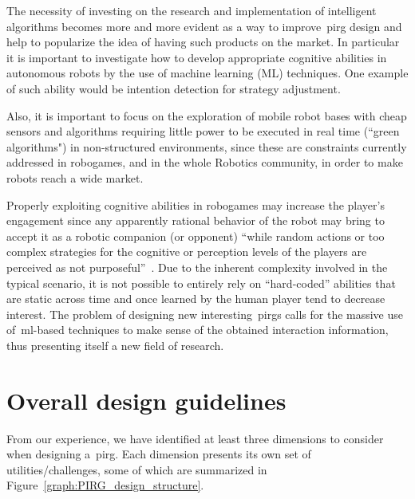 The necessity of investing on the research and implementation of intelligent algorithms becomes more and more evident as a way to improve~\gls{pirg} design and help to popularize the idea of having such products on the market. In particular it is important to investigate how to develop appropriate cognitive abilities in autonomous robots by the use of machine learning (ML) techniques. One example of such ability would be  intention detection for strategy adjustment. 

Also, it is important to focus on the exploration of mobile robot bases with cheap sensors and algorithms requiring little power to be executed in real time (``green algorithms") in non-structured environments, since these are constraints currently addressed in robogames, and in the whole Robotics community, in order to make robots reach a wide market. 

Properly exploiting cognitive abilities in robogames may increase the player's engagement since any apparently rational behavior of the robot may bring to accept it as a robotic companion (or opponent) ``while random actions or too complex strategies for the cognitive or perception levels of the players are perceived as not purposeful''~\citep{martinoia_physically_2013}. Due to the inherent complexity involved in the typical scenario, it is not possible to entirely rely on ``hard-coded'' abilities that are static across time and once learned by the human player tend to decrease interest. The problem of designing new interesting~\gls{pirg}s calls for the massive use of~\gls{ml}-based techniques to make sense of the obtained interaction information, thus presenting itself a new field of research.

\section{Overall design guidelines}\label{sec:dimensions}
From our experience, we have identified at least three dimensions to consider when designing a~\gls{pirg}. Each dimension presents its own set of utilities/challenges, some of which are summarized in Figure~\ref{graph:PIRG_design_structure}. 


